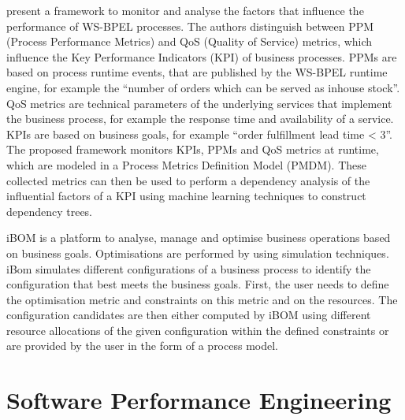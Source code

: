 \citet{Wetzstein:2009uq} present a framework to monitor and analyse the factors that influence the performance of WS-BPEL processes. The authors distinguish between PPM (Process Performance Metrics) and QoS (Quality of Service) metrics, which influence the Key Performance Indicators (KPI) of business processes. PPMs are based on process runtime events, that are published by the WS-BPEL runtime engine, for example the ``number of orders which can be served as inhouse stock''. QoS metrics are technical parameters of the underlying services that implement the business process, for example the response time and availability of a service. KPIs are based on business goals, for example ``order fulfillment lead time < 3''. The proposed framework monitors KPIs, PPMs and QoS metrics at runtime, which are modeled in a Process Metrics Definition Model (PMDM). These collected metrics can then be used to perform a dependency analysis of the influential factors of a KPI using machine learning techniques to construct dependency trees.

iBOM \citep{Castellanos:2005fk} is a platform to analyse, manage and optimise business operations based on business goals. Optimisations are performed by using simulation techniques. iBom simulates different configurations of a business process to identify the configuration that best meets the business goals. First, the user needs to define the optimisation metric and constraints on this metric and on the resources. The configuration candidates are then either computed by iBOM using different resource allocations of the given configuration within the defined constraints or are provided by the user in the form of a process model. 

\section{Software Performance Engineering}

